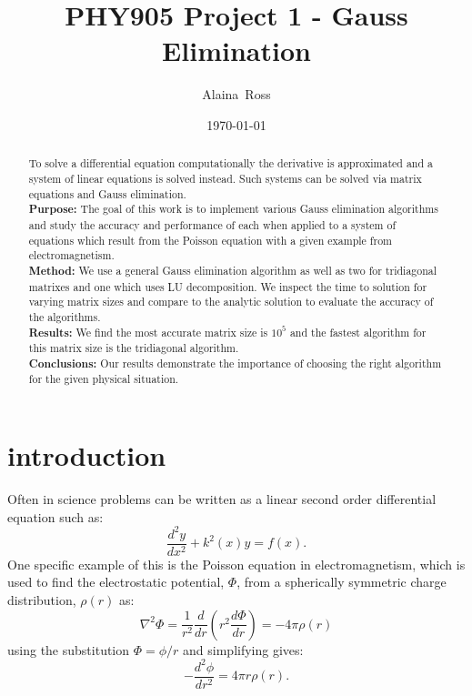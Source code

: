 \documentclass[prc,amsmath,twocolumn,superscriptaddress]{revtex4}
\begin{document}
  \newcommand {\nc} {\newcommand}
  \nc {\Sec} [1] {Sec.~\ref{#1}}
  \nc {\IR} [1] {\textcolor{red}{#1}} 

\title{PHY905 Project 1 - Gauss Elimination}


\author{Alaina~Ross}

\date{\today}


\begin{abstract}
  To solve a differential equation computationally the derivative is approximated and a system of linear equations is solved instead. Such systems can be solved via matrix equations and Gauss elimination. \\
 {\bf Purpose:} The goal of this work is to implement various Gauss elimination algorithms and study the accuracy and performance of each when applied to a system of equations which result from the Poisson equation with a given example from electromagnetism. \\
 {\bf Method:} We use a general Gauss elimination algorithm as well as two for tridiagonal matrixes and one which uses LU decomposition. We inspect the time to solution for varying matrix sizes and compare to the analytic solution to evaluate the accuracy of the algorithms. \\ 
 {\bf Results:} We find the most accurate matrix size is $10^5$ and the fastest algorithm for this matrix size is the tridiagonal algorithm. \\
 {\bf Conclusions:} Our results demonstrate the importance of choosing the right algorithm for the given physical situation.
\end{abstract}


\maketitle

\section{introduction}
\label{intro}
Often in science problems can be written as a linear second order differential equation such as:
\begin{equation}
\frac{d^2y}{dx^2}+k^2(x)y=f(x).
\end{equation}
One specific example of this is the Poisson equation in electromagnetism, which is used to find the electrostatic potential, $\Phi$, from a spherically symmetric charge distribution, $\rho (r)$ as:
\begin{equation}
\nabla^2\Phi=\frac{1}{r^2}\frac{d}{dr}\left(r^2\frac{d\Phi}{dr}\right)=-4\pi \rho(r)
\end{equation}
using the substitution $\Phi=\phi/r$ and simplifying gives:
\begin{equation}
-\frac{d^2\phi}{dr^2}=4\pi r \rho(r).
\end{equation}
\end{document}
